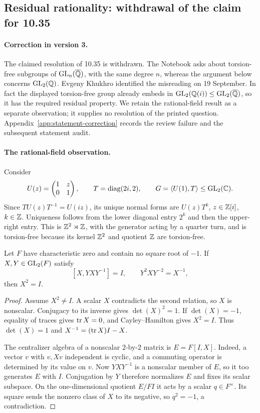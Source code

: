 \subsection{Residual rationality: withdrawal of the claim for 10.35}
\label{cand:10.35}

\paragraph{Correction in version 3.}
The claimed resolution of 10.35 is withdrawn. The Notebook asks about
torsion-free subgroups of \(\operatorname{GL}_n(\overline{\mathbb Q})\), with the same
degree \(n\), whereas the argument below concerns \(\operatorname{GL}_2(\mathbb Q)\).
Evgeny Khukhro identified the misreading on 19 September. In fact the
displayed torsion-free group already embeds in
\(\operatorname{GL}_2(\mathbb Q(i))\leq\operatorname{GL}_2(\overline{\mathbb Q})\), so it has the required
residual property. We retain the rational-field result as a separate
observation; it supplies no resolution of the printed question.
Appendix~\ref{app:statement-correction} records the review failure and
the subsequent statement audit.

\paragraph{The rational-field observation.}
Consider
\[
 U(z)=\begin{pmatrix}1&z\\0&1\end{pmatrix},\qquad
 T=\operatorname{diag}(2i,2),\qquad
 G=\langle U(1),T\rangle\leq\operatorname{GL}_2(\mathbb C).
\]
Since \(TU(z)T^{-1}=U(iz)\), its unique normal forms are
\(U(z)T^k\), \(z\in\mathbb Z[i]\), \(k\in\mathbb Z\). Uniqueness follows
from the lower diagonal entry \(2^k\) and then the upper-right
entry. This is \(\mathbb Z^2\rtimes\mathbb Z\), with the generator acting
by a quarter turn, and is torsion-free because its kernel
\(\mathbb Z^2\) and quotient \(\mathbb Z\) are torsion-free.

\begin{lemma}
Let \(F\) have characteristic zero and contain no square root
of \(-1\). If \(X,Y\in\operatorname{GL}_2(F)\) satisfy
\[
 [X,YXY^{-1}]=I,\qquad Y^2XY^{-2}=X^{-1},
\]
then \(X^2=I\).
\end{lemma}
\begin{proof}
Assume \(X^2\ne I\). A scalar \(X\) contradicts the second
relation, so \(X\) is nonscalar. Conjugacy to its inverse gives
\(\det(X)^2=1\). If \(\det(X)=-1\), equality of traces gives
\(\operatorname{tr} X=0\), and Cayley--Hamilton gives \(X^2=I\). Thus
\(\det(X)=1\) and \(X^{-1}=(\operatorname{tr} X)I-X\).

The centralizer algebra of a nonscalar \(2\)-by-\(2\) matrix
is \(E=F[I,X]\). Indeed, a vector \(v\) with \(v,Xv\)
independent is cyclic, and a commuting operator is determined
by its value on \(v\). Now \(YXY^{-1}\) is a nonscalar member
of \(E\), so it too generates \(E\) with \(I\).
Conjugation by \(Y\) therefore normalizes \(E\) and fixes
its scalar subspace. On the one-dimensional quotient \(E/FI\)
it acts by a scalar \(q\in F^\times\). Its square sends the
nonzero class of \(X\) to its negative, so \(q^2=-1\),
a contradiction.
\end{proof}

